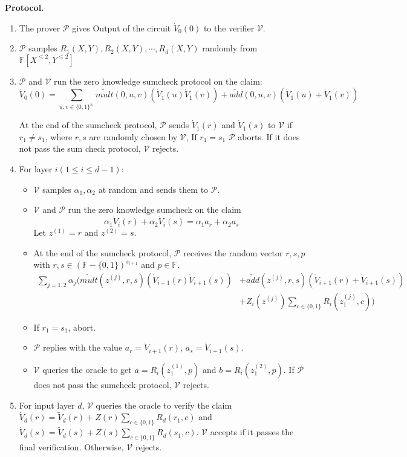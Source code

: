 \medskip\noindent\textbf{Protocol.}
\begin{enumerate} 
\item The prover $\mathcal{P}$ gives $\text{Output}$ of the circuit $\dot{V}_0(0)$ to the verifier $\mathcal{V}$. 
\item $\mathcal{P}$ samples $R_1(X, Y), R_2(X, Y), \cdots, R_d(X, Y)$ randomly from $\mathbb{F}[X^{\leqslant 2}, Y^{\leqslant 2}]$
\item $\mathcal{P}$ and $\mathcal{V}$ run the zero knowledge sumcheck protocol on the claim:
$$\dot{V}_0(0) = \sum_{u, v\in \{0,1\}^{s_1}}\tilde{mult}(0, u, v)(\dot{V}_1(u)\dot{V}_1(v))+\tilde{add}(0,u,v)(\dot{V}_1(u)+\dot{V}_1(v))$$

At the end of the sumcheck protocol, $\mathcal{P}$ sends $\dot{V}_1(r)$ and $\dot{V}_1(s)$ to $\mathcal{V}$ if $r_1 \neq s_1$, where $r, s$ are randomly chosen by $\mathcal{V}$, If $r_1 = s_1$ $\mathcal{P}$ aborts. If it does not pass the sum check protocol, $\mathcal{V}$ rejects. 

\item For layer $i(1 \leq i \leq d - 1)$:
	\begin{itemize}
	\item $\mathcal{V}$ samples $\alpha_1, \alpha_2$ at random and sends them to $\mathcal{P}$.
	\item $\mathcal{V}$ and $\mathcal{P}$ run the zero knowledge sumcheck on the claim
	$$\alpha_1 \dot{V}_i(r) + \alpha_2 \dot{V}_i(s) = \alpha_1 a_{r} + \alpha_2 a_{s}$$
	Let $z^{(1)} = r$ and $z^{(2)} = s$.
	\item At the end of the sumcheck protocol, $\mathcal{P}$ receives the random vector $r, s, p$ with $r, s \in (\mathbb{F} - \{0, 1\})^{s_{i+1}}$ and $p \in \mathbb{F}$. 
	\begin{align*}
		\sum_{j = 1, 2} \alpha_j (\tilde{mult}(z^{(j)}, r, s)(\dot{V}_{i+1}(r)\dot{V}_{i+1}(s))&+\tilde{add}(z^{(j)},r,s)(\dot{V}_{i+1}(r)+\dot{V}_{i+1}(s))\\
 		&+ Z_i(z^{(j)})\sum\limits_{c \in \{0, 1\}}R_i(z^{(j)}_1, c))
	\end{align*}
	\item If $r_1 = s_1$, abort. 
	\item $\mathcal{P}$ replies with the value $a_r = \dot{V}_{i+1}(r)$, $a_s = \dot{V}_{i+1}(s)$.
	\item $\mathcal{V}$ queries the oracle to get $a = R_i(z^{(1)}_1, p)$ and $b = R_i(z^{(2)}_1, p)$. If $\mathcal{P}$ does not pass the sumcheck protocol, $\mathcal{V}$ rejects.
	\end{itemize}

\item For input layer $d$, $\mathcal{V}$ queries the oracle to verify the claim $\dot{V}_d(r) = \tilde{V}_d(r) + Z(r)\sum\limits_{c \in \{0, 1\}}R_d(r_1, c)$ and $\dot{V}_d(s) = \tilde{V}_d(s) + Z(s)\sum\limits_{c \in \{0, 1\}}R_d(s_1, c)$. $\mathcal{V}$ accepts if it passes the final verification. Otherwise, $\mathcal{V}$ rejects. 
\end{enumerate}

